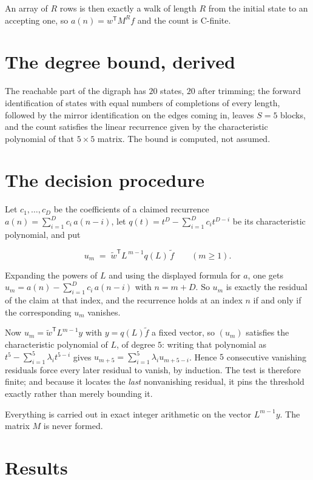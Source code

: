 \documentclass[11pt]{article}
\theoremstyle{definition}
\begin{document}
An array of $R$ rows is then exactly a walk of length $R$ from the initial state to an accepting one, so $a(n) = w^{\mathsf T}M^{R}f$ and the count is C-finite.

\section{The degree bound, derived}

The reachable part of the digraph has $20$ states, $20$ after trimming; the forward identification of states with equal numbers of completions of every length, followed by the mirror identification on the edges coming in, leaves $S = 5$ blocks, and the count satisfies the linear recurrence given by the characteristic polynomial of that $5\times5$ matrix. The bound is computed, not assumed.

\section{The decision procedure}

Let $c_1,\dots,c_D$ be the coefficients of a claimed recurrence $a(n) = \sum_{i=1}^{D} c_i\,a(n-i)$, let $q(t) = t^{D} - \sum_{i=1}^{D} c_i t^{D-i}$ be its characteristic polynomial, and put

\[u_m \;=\; \tilde w^{\mathsf T} L^{\,m-1} q(L)\,\tilde f \qquad (m \ge 1).\]

Expanding the powers of $L$ and using the displayed formula for $a$, one gets $u_m = a(n) - \sum_{i=1}^{D} c_i\,a(n-i)$ with $n = m + D$. So $u_m$ is exactly the residual of the claim at that index, and the recurrence holds at an index $n$ if and only if the corresponding $u_m$ vanishes.

Now $u_m = \tilde w^{\mathsf T} L^{m-1} y$ with $y = q(L)\tilde f$ a fixed vector, so $(u_m)$ satisfies the characteristic polynomial of $L$, of degree $5$: writing that polynomial as $t^{5} - \sum_{i=1}^{5} \lambda_i t^{5-i}$ gives $u_{m+5} = \sum_{i=1}^{5} \lambda_i u_{m+5-i}$. Hence $5$ consecutive vanishing residuals force every later residual to vanish, by induction. The test is therefore finite; and because it locates the {\itshape last} nonvanishing residual, it pins the threshold exactly rather than merely bounding it.

Everything is carried out in exact integer arithmetic on the vector $L^{m-1}y$. The matrix $M$ is never formed.

\section{Results}
\end{document}
